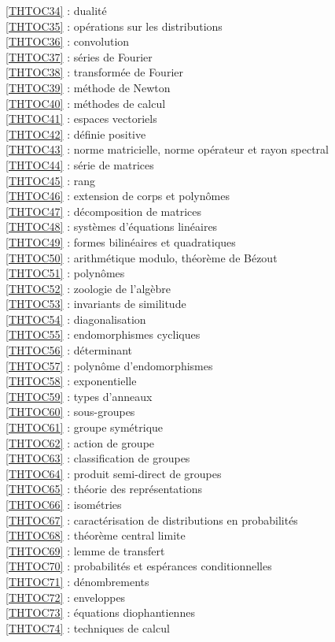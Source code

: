 \ref {THTOC34} : dualité\\
\ref {THTOC35} : opérations sur les distributions\\
\ref {THTOC36} : convolution\\
\ref {THTOC37} : séries de Fourier\\
\ref {THTOC38} : transformée de Fourier\\
\ref {THTOC39} : méthode de Newton\\
\ref {THTOC40} : méthodes de calcul\\
\ref {THTOC41} : espaces vectoriels\\
\ref {THTOC42} : définie positive\\
\ref {THTOC43} : norme matricielle, norme opérateur et rayon spectral\\
\ref {THTOC44} : série de matrices\\
\ref {THTOC45} : rang\\
\ref {THTOC46} : extension de corps et polynômes\\
\ref {THTOC47} : décomposition de matrices\\
\ref {THTOC48} : systèmes d'équations linéaires\\
\ref {THTOC49} : formes bilinéaires et quadratiques\\
\ref {THTOC50} : arithmétique modulo, théorème de Bézout\\
\ref {THTOC51} : polynômes\\
\ref {THTOC52} : zoologie de l'algèbre\\
\ref {THTOC53} : invariants de similitude\\
\ref {THTOC54} : diagonalisation\\
\ref {THTOC55} : endomorphismes cycliques\\
\ref {THTOC56} : déterminant\\
\ref {THTOC57} : polynôme d'endomorphismes\\
\ref {THTOC58} : exponentielle\\
\ref {THTOC59} : types d'anneaux\\
\ref {THTOC60} : sous-groupes\\
\ref {THTOC61} : groupe symétrique\\
\ref {THTOC62} : action de groupe\\
\ref {THTOC63} : classification de groupes\\
\ref {THTOC64} : produit semi-direct de groupes\\
\ref {THTOC65} : théorie des représentations\\
\ref {THTOC66} : isométries\\
\ref {THTOC67} : caractérisation de distributions en probabilités\\
\ref {THTOC68} : théorème central limite\\
\ref {THTOC69} : lemme de transfert\\
\ref {THTOC70} : probabilités et espérances conditionnelles\\
\ref {THTOC71} : dénombrements\\
\ref {THTOC72} : enveloppes\\
\ref {THTOC73} : équations diophantiennes\\
\ref {THTOC74} : techniques de calcul\\
